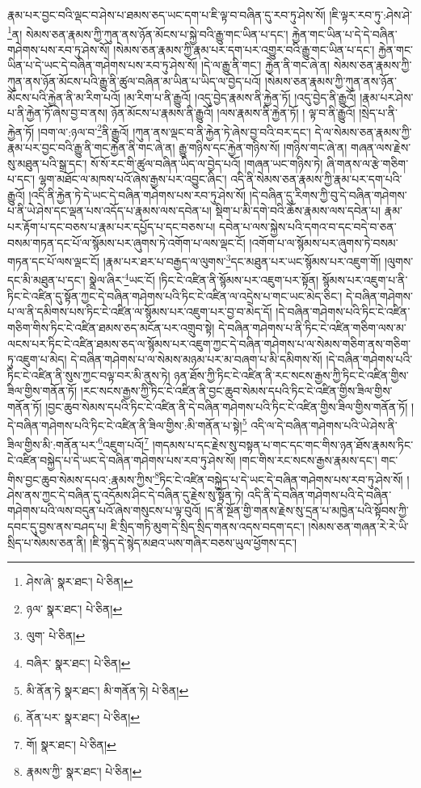 རྣམ་པར་བྱང་བའི་ལྡང་བ་ཤེས་པ་ཐམས་ཅད་ཡང་དག་པ་ཇི་ལྟ་བ་བཞིན་དུ་རབ་ཏུ་ཤེས་སོ། །ཇི་ལྟར་རབ་ཏུ་:ཤེས་ཤེ་\footnote{ཤེས་ཞེ་  སྣར་ཐང་།  པེ་ཅིན། }ན། སེམས་ཅན་རྣམས་ཀྱི་ཀུན་ནས་ཉོན་མོངས་པ་སྐྱེ་བའི་རྒྱུ་གང་ཡིན་པ་དང་། རྐྱེན་གང་ཡིན་པ་དེ་དེ་བཞིན་གཤེགས་པས་རབ་ཏུ་ཤེས་སོ། །སེམས་ཅན་རྣམས་ཀྱི་རྣམ་པར་དག་པར་འགྱུར་བའི་རྒྱུ་གང་ཡིན་པ་དང་། རྐྱེན་གང་ཡིན་པ་དེ་ཡང་དེ་བཞིན་གཤེགས་པས་རབ་ཏུ་ཤེས་སོ། །དེ་ལ་རྒྱུ་ནི་གང་། རྐྱེན་ནི་གང་ཞེ་ན། སེམས་ཅན་རྣམས་ཀྱི་ཀུན་ནས་ཉོན་མོངས་པའི་རྒྱུ་ནི་ཚུལ་བཞིན་མ་ཡིན་པ་ཡིད་ལ་བྱེད་པའོ། །སེམས་ཅན་རྣམས་ཀྱི་ཀུན་ནས་ཉོན་མོངས་པའི་རྐྱེན་ནི་མ་རིག་པའོ། །མ་རིག་པ་ནི་རྒྱུའོ། །འདུ་བྱེད་རྣམས་ནི་རྐྱེན་ཏོ། །འདུ་བྱེད་ནི་རྒྱུའོ། །རྣམ་པར་ཤེས་པ་ནི་རྐྱེན་ཏོ་ཞེས་བྱ་བ་ནས། ཉོན་མོངས་པ་རྣམས་ནི་རྒྱུའོ། །ལས་རྣམས་ནི་རྐྱེན་ཏོ། །
ལྟ་བ་ནི་རྒྱུའོ། །སྲེད་པ་ནི་རྐྱེན་ཏོ། །བག་ལ་:ཉལ་བ་\footnote{ཉལ་  སྣར་ཐང་།  པེ་ཅིན། }ནི་རྒྱུའོ། །ཀུན་ནས་ལྡང་བ་ནི་རྐྱེན་ཏེ་ཞེས་བྱ་བའི་བར་དང་། དེ་ལ་སེམས་ཅན་རྣམས་ཀྱི་རྣམ་པར་བྱང་བའི་རྒྱུ་ནི་གང་རྐྱེན་ནི་གང་ཞེ་ན། རྒྱུ་གཉིས་དང་རྐྱེན་གཉིས་སོ། །གཉིས་གང་ཞེ་ན། གཞན་ལས་རྗེས་སུ་མཐུན་པའི་སྒྲ་དང་། སོ་སོ་རང་གི་ཚུལ་བཞིན་ཡིད་ལ་བྱེད་པའོ། །གཞན་ཡང་གཉིས་ཏེ། ཞི་གནས་ལ་རྩེ་གཅིག་པ་དང་། ལྷག་མཐོང་ལ་མཁས་པའོ་ཞེས་རྒྱས་པར་འབྱུང་ཞིང་། འདི་ནི་སེམས་ཅན་རྣམས་ཀྱི་རྣམ་པར་དག་པའི་རྒྱུའོ། །འདི་ནི་རྐྱེན་ཏེ་དེ་ཡང་དེ་བཞིན་གཤེགས་པས་རབ་ཏུ་ཤེས་སོ། །དེ་བཞིན་དུ་རིགས་ཀྱི་བུ་དེ་བཞིན་གཤེགས་པ་ནི་ཡེ་ཤེས་དང་ལྡན་པས་འདོད་པ་རྣམས་ལས་དབེན་པ། སྡིག་པ་མི་དགེ་བའི་ཆོས་རྣམས་ལས་དབེན་པ། རྣམ་པར་རྟོག་པ་དང་བཅས་པ་རྣམ་པར་དཔྱོད་པ་དང་བཅས་པ། དབེན་པ་ལས་སྐྱེས་པའི་དགའ་བ་དང་བདེ་བ་ཅན་བསམ་གཏན་དང་པོ་ལ་སྙོམས་པར་ཞུགས་ཏེ་འགོག་པ་ལས་ལྡང་ངོ། །འགོག་པ་ལ་སྙོམས་པར་ཞུགས་ཏེ་བསམ་གཏན་དང་པོ་ལས་ལྡང་ངོ། །རྣམ་པར་ཐར་པ་བརྒྱད་ལ་ལུགས་\footnote{ལུག་  པེ་ཅིན། }དང་མཐུན་པར་ཡང་སྙོམས་པར་འཇུག་གོ། །ལུགས་དང་མི་མཐུན་པ་དང་། སྣྲེལ་ཞིར་\footnote{བཞིར་  སྣར་ཐང་།  པེ་ཅིན། }ཡང་ངོ། །ཏིང་ངེ་འཛིན་ནི་སྙོམས་པར་འཇུག་པར་སྟོན། སྙོམས་པར་འཇུག་པ་ནི་ཏིང་ངེ་འཛིན་དུ་སྟོན་ཀྱང་དེ་བཞིན་གཤེགས་པའི་ཏིང་ངེ་འཛིན་ལ་འདྲེས་པ་གང་ཡང་མེད་ཅིང་། དེ་བཞིན་གཤེགས་པ་ལ་ནི་དམིགས་པས་ཏིང་ངེ་འཛིན་ལ་སྙོམས་པར་འཇུག་པར་བྱ་བ་མེད་དོ། །དེ་བཞིན་གཤེགས་པའི་ཏིང་ངེ་འཛིན་གཅིག་གིས་ཏིང་ངེ་འཛིན་ཐམས་ཅད་མངོན་པར་འགྲུབ་སྟེ། དེ་བཞིན་གཤེགས་པ་ནི་ཏིང་ངེ་འཛིན་གཅིག་ལས་མ་ལངས་པར་ཏིང་ངེ་འཛིན་ཐམས་ཅད་ལ་སྙོམས་པར་འཇུག་ཀྱང་དེ་བཞིན་གཤེགས་པ་ལ་སེམས་གཅིག་ནས་གཅིག་ཏུ་འཇུག་པ་མེད། དེ་བཞིན་གཤེགས་པ་ལ་སེམས་མཉམ་པར་མ་བཞག་པ་མི་དམིགས་སོ། །དེ་བཞིན་གཤེགས་པའི་ཏིང་ངེ་འཛིན་ནི་སུས་ཀྱང་བལྟ་བར་མི་ནུས་ཏེ། ཉན་ཐོས་ཀྱི་ཏིང་ངེ་འཛིན་ནི་རང་སངས་རྒྱས་ཀྱི་ཏིང་ངེ་འཛིན་གྱིས་ཟིལ་གྱིས་གནོན་ཏོ། །རང་སངས་རྒྱས་ཀྱི་ཏིང་ངེ་འཛིན་ནི་བྱང་ཆུབ་སེམས་དཔའི་ཏིང་ངེ་འཛིན་གྱིས་ཟིལ་གྱིས་གནོན་ཏོ། །བྱང་ཆུབ་སེམས་དཔའི་ཏིང་ངེ་འཛིན་ནི་དེ་བཞིན་གཤེགས་པའི་ཏིང་ངེ་འཛིན་གྱིས་ཟིལ་གྱིས་གནོན་ཏོ། །དེ་བཞིན་གཤེགས་པའི་ཏིང་ངེ་འཛིན་ནི་ཟིལ་གྱིས་:མི་གནོན་པ་སྟེ།\footnote{མི་ནོན་ཏེ  སྣར་ཐང་། མི་གནོན་ཏེ།  པེ་ཅིན། } འདི་ལ་དེ་བཞིན་གཤེགས་པའི་ཡེ་ཤེས་ནི་ཟིལ་གྱིས་མི་:གནོན་པར་\footnote{ནོན་པར་  སྣར་ཐང་།  པེ་ཅིན། }འཇུག་པའོ།\footnote{གོ།  སྣར་ཐང་།  པེ་ཅིན། } །གདམས་པ་དང་རྗེས་སུ་བསྟན་པ་གང་དང་གང་གིས་ཉན་ཐོས་རྣམས་ཏིང་ངེ་འཛིན་བསྐྱེད་པ་དེ་ཡང་དེ་བཞིན་གཤེགས་པས་རབ་ཏུ་ཤེས་སོ། །གང་གིས་རང་སངས་རྒྱས་རྣམས་དང་། གང་གིས་བྱང་ཆུབ་སེམས་དཔའ་:རྣམས་ཀྱིས་\footnote{རྣམས་ཀྱི་  སྣར་ཐང་།  པེ་ཅིན། }ཏིང་ངེ་འཛིན་བསྐྱེད་པ་དེ་ཡང་དེ་བཞིན་གཤེགས་པས་རབ་ཏུ་ཤེས་སོ། །ཤེས་ནས་ཀྱང་དེ་བཞིན་དུ་འདོམས་ཤིང་དེ་བཞིན་དུ་རྗེས་སུ་སྟོན་ཏེ། འདི་ནི་དེ་བཞིན་གཤེགས་པའི་དེ་བཞིན་གཤེགས་པའི་ལས་བདུན་པའོ་ཞེས་གསུངས་པ་ལྟ་བུའོ། །ད་ནི་སྔོན་གྱི་གནས་རྗེས་སུ་དྲན་པ་མཁྱེན་པའི་སྟོབས་ཀྱི་དབང་དུ་བྱས་ནས་བཤད་པ། ཇི་སྲིད་གཏི་མུག་དེ་སྲིད་སྲིད་གནས་འདས་བདག་དང་། །སེམས་ཅན་གཞན་རེ་རེ་ཡི་སྲིད་པ་སེམས་ཅན་ནི། །ཇི་སྙེད་དེ་སྙེད་མཐའ་ཡས་གཞིར་བཅས་ཡུལ་ཕྱོགས་དང་། 